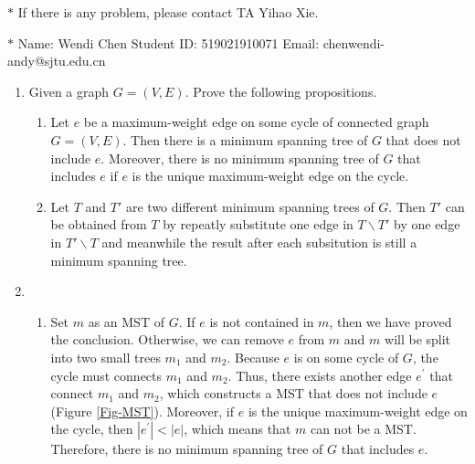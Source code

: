 \documentclass[12pt,a4paper]{article}
\makeatletter
\newtheorem*{solution}{Solution}
\theoremstyle{definition}
\renewenvironment{solution}[1][Solution] {\par\pushQED{\qed}\normalfont\topsep6\p@\@plus6\p@\relax\trivlist\item[\hskip\labelsep\bfseries#1\@addpunct{.}]\ignorespaces}{\popQED\endtrivlist\@endpefalse} \makeatother
\makeatother
\begin{document}
\noindent

\noindent{}
\begin{center}
\footnotesize{\color{red}$*$ If there is any problem, please contact TA Yihao Xie. }

\footnotesize{\color{blue}$*$ Name: Wendi Chen  \quad Student ID: 519021910071 \quad Email: chenwendi-andy@sjtu.edu.cn}
\end{center}

\begin{enumerate}

	\item Given a graph $G = (V, E)$. Prove the following propositions.
	
	\begin{enumerate}
		\item Let $e$ be a maximum-weight edge on some cycle of connected graph $G=(V,E)$.
        Then there is a minimum spanning tree of $G$ that does not include $e$. Moreover, there is no minimum spanning tree of $G$ that includes $e$ if $e$ is the unique maximum-weight edge on the cycle. 
		\item Let $T$ and $T'$ are two different minimum spanning trees of $G$. Then $T'$ can be obtained from $T$ by repeatly substitute one edge in $T\backslash T'$ by one edge in $T'\backslash T$ and meanwhile the result after each subsitution is still a minimum spanning tree.
	\end{enumerate}
	
	\begin{solution}
	~
	\begin{enumerate}
	    \item 
	    Set $m$ as an MST of $G$. If $e$ is not contained in $m$, then we have proved the conclusion. Otherwise, we can remove $e$ from $m$ and $m$ will be split into two small trees $m_1$ and $m_2$. Because $e$ is on some cycle of $G$, the cycle must connects $m_1$ and $m_2$. Thus, there exists another edge $e^{'}$ that connect $m_1$ and $m_2$, which constructs a MST that does not include $e$ (Figure \ref{Fig-MST}). Moreover, if $e$ is the unique maximum-weight edge on the cycle, then $|e^{'}|<|e|$, which means that $m$ can not be a MST. Therefore, there is no minimum spanning tree of $G$ that includes $e$. 
	    

\end{enumerate}
\end{solution}
\end{enumerate}
\end{document}
